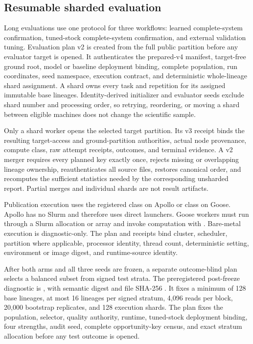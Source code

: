 \subsection{Resumable sharded evaluation}
Long evaluations use one protocol for three workflows: learned complete-system confirmation, tuned-stock complete-system confirmation, and external validation tuning. Evaluation plan v2 is created from the full public partition before any evaluator target is opened. It authenticates the prepared-v4 manifest, target-free ground root, model or baseline deployment binding, complete population, run coordinates, seed namespace, execution contract, and deterministic whole-lineage shard assignment. A shard owns every task and repetition for its assigned immutable base lineages. Identity-derived initializer and evaluator seeds exclude shard number and processing order, so retrying, reordering, or moving a shard between eligible machines does not change the scientific sample.

Only a shard worker opens the selected target partition. Its v3 receipt binds the resulting target-access and ground-partition authorities, actual node provenance, compute class, raw attempt receipts, outcomes, and terminal evidence. A v2 merger requires every planned key exactly once, rejects missing or overlapping lineage ownership, reauthenticates all source files, restores canonical order, and recomputes the sufficient statistics needed by the corresponding unsharded report. Partial merges and individual shards are not result artifacts.

Publication execution uses the registered  class on Apollo or  class on Goose. Apollo has no Slurm and therefore uses direct launchers. Goose workers must run through a Slurm allocation or array and invoke computation with . Bare-metal execution is diagnostic-only. The plan and receipts bind cluster, scheduler, partition where applicable, processor identity, thread count, deterministic setting, environment or image digest, and runtime-source identity.

After both arms and all three seeds are frozen, a separate outcome-blind plan selects a balanced subset from signed test strata. The preregistered post-freeze diagnostic is , with semantic digest  and file SHA-256 . It fixes a minimum of 128 base lineages, at most 16 lineages per signed stratum, 4,096 reads per block, 20,000 bootstrap replicates, and 128 execution shards. The plan fixes the population, selector, quality authority, runtime, tuned-stock deployment binding, four strengths, audit seed, complete opportunity-key census, and exact stratum allocation before any test outcome is opened.

